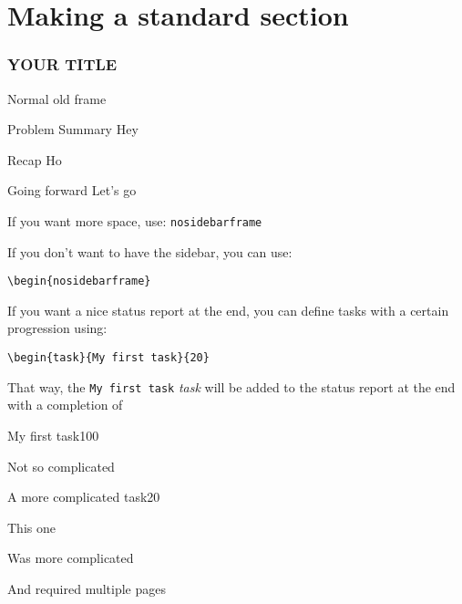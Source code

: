\section{Making a standard section} 

\begin{frame}\frametitle{YOUR TITLE}
Normal old frame		
\end{frame}

\begin{frame}	
	\begin{block}{Problem Summary}
	Hey
	\end{block}
	
	
	\begin{exampleblock}{Recap}
	Ho
	\end{exampleblock}
	
	\begin{alertblock}{Going forward}
	Let's go
	\end{alertblock}

\end{frame}


\begin{nosidebarframe}
\centering
 If you want more space, use: \texttt{nosidebarframe}
\end{nosidebarframe}






\begin{frame}[containsverbatim]

If you don't want to have the sidebar, you can use:

\verb|\begin{nosidebarframe}|

If you want a nice status report at the end, you can define tasks with a certain progression using:

\verb|\begin{task}{My first task}{20}|

That way, the \texttt{My first task} \textit{task} will be added to the status report at the end with a completion of 

\end{frame}


\begin{task}{My first task}{100}

Not so complicated

\end{task}

\begin{task}{A more complicated task}{20}

This one

\pagebreak

Was more complicated

\pagebreak

And required multiple pages
\end{task}




